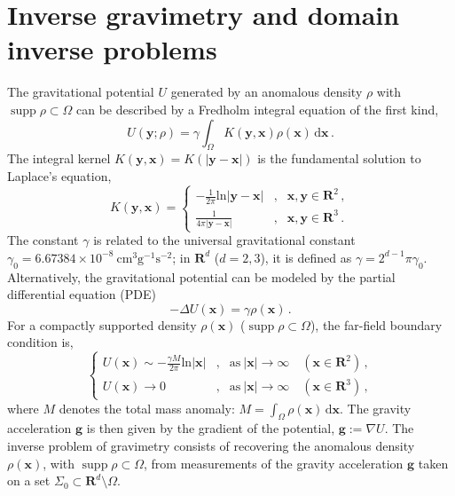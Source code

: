 \documentclass[final,hidelinks,onefignum,onetabnum]{siamart251216}
\begin{document}
\section{Inverse gravimetry and domain inverse problems} \label{sec2}
The gravitational potential $U$ generated by an anomalous density $\rho$ with $\operatorname{supp}\rho\subset\Omega$ can be described by a Fredholm integral equation of the first kind,
\begin{equation}\label{eqn1}
U(\mathbf{y};\rho)=\gamma\int_\Omega K(\mathbf{y},\mathbf{x})\rho(\mathbf{x})\,\mathrm{d}\mathbf{x}\,.
\end{equation}
The integral kernel $K(\mathbf{y},\mathbf{x})=K(|\mathbf{y}-\mathbf{x}|)$ is the fundamental solution to Laplace's equation,
\begin{equation}\label{eqn2}
K(\mathbf{y},\mathbf{x})=\left\{\begin{array}{ccc}
-\frac{1}{2\pi}\mathrm{ln}|\mathbf{y}-\mathbf{x}| &,&\mathbf{x},\mathbf{y}\in\mathbf{R}^2\,,\\
\frac{1}{4\pi|\mathbf{y}-\mathbf{x}|} &,&\mathbf{x},\mathbf{y}\in\mathbf{R}^3\,.
\end{array}\right.
\end{equation}
The constant $\gamma$ is related to the universal gravitational constant $\gamma_0 = 6.67384 \times 10^{-8} \ \mathrm{cm}^3 \mathrm{g}^{-1} \mathrm{s}^{-2}$; in $\mathbf{R}^d$ ($d=2,3$), it is defined as $\gamma = 2^{d-1}\pi \gamma_0$. 
Alternatively, the gravitational potential can be modeled by the partial differential equation (PDE)
\begin{equation} \label{eqn3}
-\Delta U(\mathbf{x})=\gamma\rho(\mathbf{x})\,.
\end{equation}
For a compactly supported density $\rho(\mathbf{x})$ ($\operatorname{supp}\rho\subset\Omega$), the far-field boundary condition is,
\begin{equation} \label{eqn4}
\left\{\begin{array}{ccc}
U(\mathbf{x})\sim -\frac{\gamma M}{2\pi}\mathrm{ln}|\mathbf{x}| &,&\mathrm{as} \  |\mathbf{x}|\to\infty \quad  (\mathbf{x}\in\mathbf{R}^2)\,,\\
U(\mathbf{x})\to 0 &,&\mathrm{as} \  |\mathbf{x}|\to\infty \quad (\mathbf{x}\in\mathbf{R}^3)\,,
\end{array}\right.
\end{equation}
where $M$ denotes the total mass anomaly: $M=\int_\Omega\rho(\mathbf{x})\,\mathrm{d}\mathbf{x}$.
The gravity acceleration $\mathbf{g}$ is then given by the gradient of the potential, $\mathbf{g}:= \nabla U$. The inverse problem of gravimetry consists of recovering the anomalous density $\rho(\mathbf{x})$, with $\operatorname{supp}\rho\subset\Omega$, from measurements of the gravity acceleration $\mathbf{g}$ taken on a set $\Sigma_0 \subset \mathbf{R}^d \setminus \Omega$.
\end{document}
